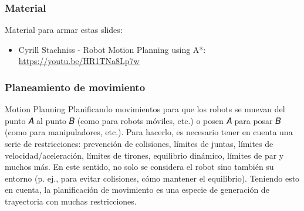 \begin{frame}
	\frametitle{Material}
	
	Material para armar estas slides:
	\begin{itemize}
		\item Cyrill Stachniss - Robot Motion Planning using A*: \url{https://youtu.be/HR1TNa8Lp7w}
	\end{itemize}
	
\end{frame}

\begin{frame}
	\frametitle{Planeamiento de movimiento}

	\begin{block}{Motion Planning}
		Planificando movimientos para que los robots se muevan del punto 𝐴 al punto 𝐵 (como para robots móviles, etc.) o posen 𝐴 para posar 𝐵 (como para manipuladores, etc.). Para hacerlo, es necesario tener en cuenta una serie de restricciones: prevención de colisiones, límites de juntas, límites de velocidad/aceleración, límites de tirones, equilibrio dinámico, límites de par y muchos más. En este sentido, no solo se considera el robot sino también su entorno (p. ej., para evitar colisiones, cómo mantener el equilibrio). Teniendo esto en cuenta, la planificación de movimiento es una especie de generación de trayectoria con muchas restricciones.
	\end{block}

\end{frame}